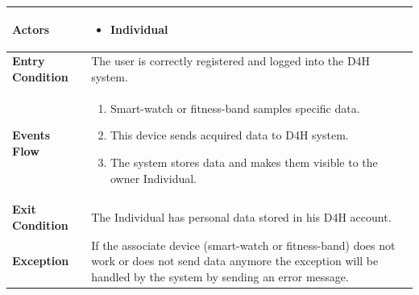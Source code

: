             \begin{table}[H]
            	\centering
                
                \begin{tabular}{|p{3cm}|p{8.2cm}|}
                    \hline
                    \textbf{Actors} & \begin{itemize}
                        \item Individual
                    \end{itemize} \\
                     \hline
                    \textbf{Entry Condition} & The user is correctly registered and logged into the D4H system. \\
                     \hline
                    \textbf{Events Flow} & \begin{enumerate}
                                                \item Smart-watch or fitness-band samples specific data.
                                                \item This device sends acquired data to D4H system.
                                                \item The system stores data and makes them visible to the owner Individual.
                                            \end{enumerate}\\
                     \hline
                    \textbf{Exit Condition} & The Individual has personal data stored in his D4H account.\\
                     \hline
                    \textbf{Exception} & If the associate device (smart-watch or fitness-band) does not work or does not send data anymore the exception will be handled by the system by sending an error message. \\
                     \hline
                \end{tabular}  
            \end{table} 
            
